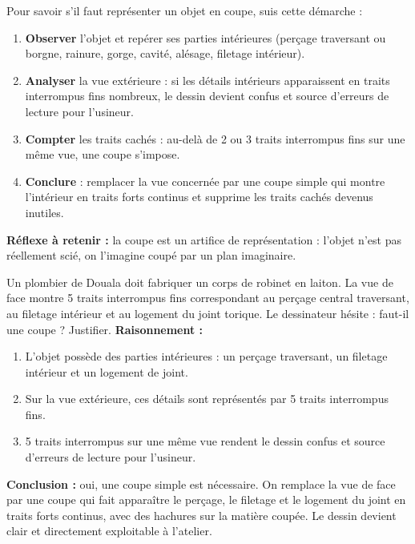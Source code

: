 \documentclass[11pt]{article}
\newcommand{\cle}[1]{{\popxbold\color{popdark}#1}}
\begin{document}
\begin{methode}
Pour savoir s'il faut représenter un objet en coupe, suis cette démarche :
\begin{enumerate}
\item \textbf{Observer} l'objet et repérer ses parties \cle{intérieures} (perçage traversant ou borgne, rainure, gorge, cavité, alésage, filetage intérieur).
\item \textbf{Analyser} la vue extérieure : si les détails intérieurs apparaissent en \cle{traits interrompus fins} nombreux, le dessin devient confus et source d'erreurs de lecture pour l'usineur.
\item \textbf{Compter} les traits cachés : au-delà de 2 ou 3 traits interrompus fins sur une même vue, une coupe s'impose.
\item \textbf{Conclure} : remplacer la vue concernée par une \cle{coupe simple} qui montre l'intérieur en traits forts continus et supprime les traits cachés devenus inutiles.
\end{enumerate}
\textbf{Réflexe à retenir :} la coupe est un artifice de représentation : l'objet n'est pas réellement scié, on l'imagine coupé par un plan imaginaire.
\end{methode}

\begin{exoresolu}
Un plombier de Douala doit fabriquer un corps de robinet en laiton. La vue de face montre 5 traits interrompus fins correspondant au perçage central traversant, au filetage intérieur et au logement du joint torique. Le dessinateur hésite : faut-il une coupe ? Justifier.
\tcblower
\textbf{Raisonnement :}
\begin{enumerate}
\item L'objet possède des parties intérieures : un perçage traversant, un filetage intérieur et un logement de joint.
\item Sur la vue extérieure, ces détails sont représentés par 5 traits interrompus fins.
\item 5 traits interrompus sur une même vue rendent le dessin confus et source d'erreurs de lecture pour l'usineur.
\end{enumerate}
\textbf{Conclusion :} oui, une coupe simple est nécessaire. On remplace la vue de face par une coupe qui fait apparaître le perçage, le filetage et le logement du joint en \cle{traits forts continus}, avec des \cle{hachures} sur la matière coupée. Le dessin devient clair et directement exploitable à l'atelier.
\end{exoresolu}
\end{document}
